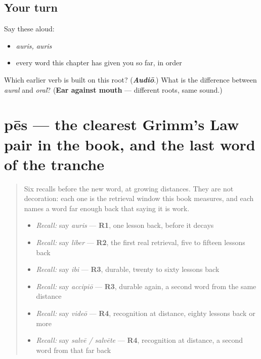 \subsection*{Your turn}
Say these aloud:

\begin{itemize}
\raggedright
  \item \emph{auris, auris}
  \item every word this chapter has given you so far, in order
\end{itemize}

\begin{tcolorbox}[breakable,colback=teal!4,colframe=teal!35!black,title={Before you move on}]
Which earlier verb is built on this root? (\emph{\textbf{Audiō}}.) What is the difference between \emph{aural} and \emph{oral}? (\textbf{Ear against mouth} — different roots, same sound.)
\end{tcolorbox}
\section[pēs, pedis]{pēs — the clearest Grimm's Law pair in the book, and the last word of the tranche}

\label{lesson:LA-C54-pes}



\begin{quote}
Six recalls before the new word, at growing distances. They are not decoration: each one is the retrieval window this book measures, and each names a word far enough back that saying it is work.

\begin{itemize}
\raggedright
  \item \emph{Recall:} say \emph{auris} — \textbf{R1}, one lesson back, before it decays
  \item \emph{Recall:} say \emph{liber} — \textbf{R2}, the first real retrieval, five to fifteen lessons back
  \item \emph{Recall:} say \emph{ibi} — \textbf{R3}, durable, twenty to sixty lessons back
  \item \emph{Recall:} say \emph{accipiō} — \textbf{R3}, durable again, a second word from the same distance
  \item \emph{Recall:} say \emph{videō} — \textbf{R4}, recognition at distance, eighty lessons back or more
  \item \emph{Recall:} say \emph{salvē / salvēte} — \textbf{R4}, recognition at distance, a second word from that far back
\end{itemize}
\end{quote}

